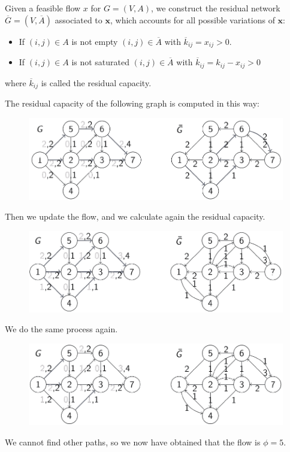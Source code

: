 \documentclass[12pt, a4paper]{report}
\begin{document}
    Given a feasible flow $x$ for $G=(V,A)$, we construct the residual network $\overline{G}=(V,\overline{A})$ associated to $\boldsymbol{x}$, which 
    accounts for all possible variations of $\boldsymbol{x}$: 
    \begin{itemize}
        \item If $(i,j) \in A$ is not empty $(i,j) \in \overline{A}$ with $\overline{k}_{ij}=x_{ij}>0$.
        \item If $(i,j) \in A$ is not saturated $(i,j) \in \overline{A}$ with $\overline{k}_{ij}=k_{ij}-x_{ij}>0$
    \end{itemize}
    where $\overline{k}_{ij}$ is called the residual capacity. 
    \begin{example}
        The residual capacity of the following graph is computed in this way: 
        \begin{figure}[H]
            \centering
            \includegraphics[width=0.75\linewidth]{images/residual1.png}
        \end{figure}
        Then we update the flow, and we calculate again the residual capacity. 
        \begin{figure}[H]
            \centering
            \includegraphics[width=0.75\linewidth]{images/residual2.png}
        \end{figure}
        We do the same process again.
        \begin{figure}[H]
            \centering
            \includegraphics[width=0.75\linewidth]{images/residual3.png}
        \end{figure}
        We cannot find other paths, so we now have obtained that the flow is $\phi=5$.
    \end{example}
\end{document}
